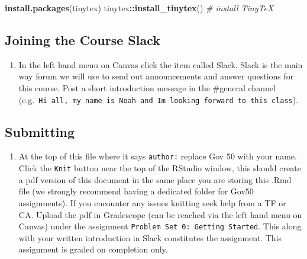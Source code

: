 \documentclass[
  11pt,
  letterpaper]{article}
\newenvironment{Shaded}{\begin{snugshade}}{\end{snugshade}}
\newcommand{\CommentTok}[1]{\textcolor[rgb]{0.56,0.35,0.01}{\textit{#1}}}
\newcommand{\FunctionTok}[1]{\textcolor[rgb]{0.13,0.29,0.53}{\textbf{#1}}}
\newcommand{\NormalTok}[1]{#1}
\newcommand{\SpecialCharTok}[1]{\textcolor[rgb]{0.81,0.36,0.00}{\textbf{#1}}}
\newcommand{\StringTok}[1]{\textcolor[rgb]{0.31,0.60,0.02}{#1}}
\providecommand{\tightlist}{%
  \setlength{\itemsep}{0pt}\setlength{\parskip}{0pt}}
\begin{document}
\begin{Shaded}
\begin{Highlighting}[]
\FunctionTok{install.packages}\NormalTok{(}\StringTok{\textquotesingle{}tinytex\textquotesingle{}}\NormalTok{)}
\NormalTok{tinytex}\SpecialCharTok{::}\FunctionTok{install\_tinytex}\NormalTok{()  }\CommentTok{\# install TinyTeX}
\end{Highlighting}
\end{Shaded}

\subsection{Joining the Course Slack}\label{joining-the-course-slack}

\begin{enumerate}
\def\labelenumi{\arabic{enumi}.}
\setcounter{enumi}{4}
\tightlist
\item
  In the left hand menu on Canvas click the item called Slack. Slack is
  the main way forum we will use to send out announcements and answer
  questions for this course. Post a short introduction message in the
  \#general channel
  (e.g.~\texttt{Hi\ all,\ my\ name\ is\ Noah\ and\ I\textquotesingle{}m\ looking\ forward\ to\ this\ class}).
\end{enumerate}

\subsection{Submitting}\label{submitting}

\begin{enumerate}
\def\labelenumi{\arabic{enumi}.}
\setcounter{enumi}{5}
\tightlist
\item
  At the top of this file where it says \texttt{author:} replace Gov 50
  with your name. Click the \texttt{Knit} button near the top of the
  RStudio window, this should create a pdf version of this document in
  the same place you are storing this .Rmd file (we strongly recommend
  having a dedicated folder for Gov50 assignments). If you encounter any
  issues knitting seek help from a TF or CA. Upload the pdf in
  Gradescope (can be reached via the left hand menu on Canvas) under the
  assignment \texttt{Problem\ Set\ 0:\ Getting\ Started}. This along
  with your written introduction in Slack constitutes the assignment.
  This assignment is graded on completion only.
\end{enumerate}
\end{document}
